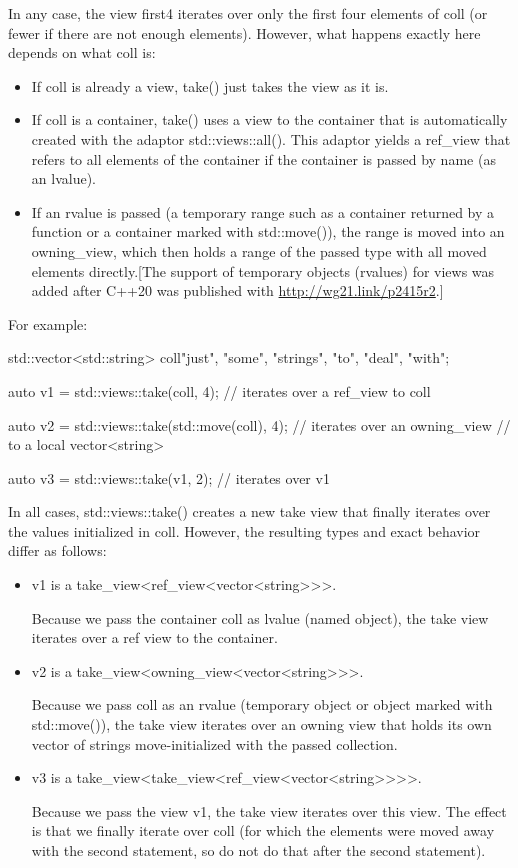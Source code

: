 In any case, the view first4 iterates over only the first four elements of coll (or fewer if there are not enough elements). However, what happens exactly here depends on what coll is:

\begin{itemize}
\item
If coll is already a view, take() just takes the view as it is.

\item
If coll is a container, take() uses a view to the container that is automatically created with the adaptor std::views::all(). This adaptor yields a ref\_view that refers to all elements of the container if the container is passed by name (as an lvalue).

\item
If an rvalue is passed (a temporary range such as a container returned by a function or a container marked with std::move()), the range is moved into an owning\_view, which then holds a range of the passed type with all moved elements directly.[The support of temporary objects (rvalues) for views was added after C++20 was published with \url{http://wg21.link/p2415r2}.]
\end{itemize}

For example:

\begin{cpp}
std::vector<std::string> coll{"just", "some", "strings", "to", "deal", "with"};

auto v1 = std::views::take(coll, 4); // iterates over a ref_view to coll

auto v2 = std::views::take(std::move(coll), 4); // iterates over an owning_view
// to a local vector<string>

auto v3 = std::views::take(v1, 2); // iterates over v1
\end{cpp}

In all cases, std::views::take() creates a new take view that finally iterates over the values initialized in coll. However, the resulting types and exact behavior differ as follows:

\begin{itemize}
\item
v1 is a take\_view<ref\_view<vector<string>{}>{}>.

Because we pass the container coll as lvalue (named object), the take view iterates over a ref view to the container.

\item
v2 is a take\_view<owning\_view<vector<string>{}>{}>.

Because we pass coll as an rvalue (temporary object or object marked with std::move()), the take view iterates over an owning view that holds its own vector of strings move-initialized with the passed collection.

\item
v3 is a take\_view<take\_view<ref\_view<vector<string>{}>{}>{}>.

Because we pass the view v1, the take view iterates over this view. The effect is that we finally iterate over coll (for which the elements were moved away with the second statement, so do not do that after the second statement).
\end{itemize}


